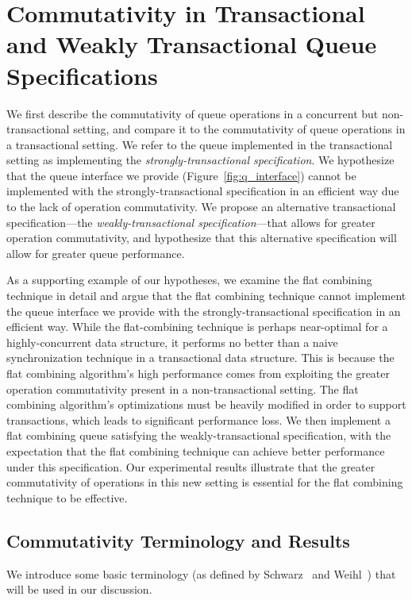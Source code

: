 \chapter{Commutativity in Transactional and Weakly Transactional Queue Specifications}
\label{commutativity}

We first describe the commutativity of queue operations in a concurrent but non-transactional setting, and compare it to the commutativity of queue operations in a transactional setting. We refer to the queue implemented in the transactional setting as implementing the \emph{strongly-transactional specification}. We hypothesize that the queue interface we provide (Figure~\ref{fig:q_interface}) cannot be implemented with the strongly-transactional specification in an efficient way due to the lack of operation commutativity. We propose an alternative transactional specification---the \emph{weakly-transactional specification}---that allows for greater operation commutativity, and hypothesize that this alternative specification will allow for greater queue performance.

As a supporting example of our hypotheses, we examine the flat combining technique in detail and argue that the flat combining technique cannot implement the queue interface we provide with the strongly-transactional specification in an efficient way. While the flat-combining technique is perhaps near-optimal for a highly-concurrent data structure, it performs no better than a naive synchronization technique in a transactional data structure. This is because the flat combining algorithm's high performance comes from exploiting the greater operation commutativity present in a non-transactional setting. The flat combining algorithm's optimizations must be heavily modified in order to support transactions, which leads to significant performance loss. 
We then implement a flat combining queue satisfying the weakly-transactional specification, with the expectation that the flat combining technique can achieve better performance under this specification. Our experimental results illustrate that the greater commutativity of operations in this new setting is essential for the flat combining technique to be effective.

\section{Commutativity Terminology and Results}
We introduce some basic terminology (as defined by Schwarz~\cite{schwarz} and Weihl~\cite{weihl}) that will be used in our discussion.

